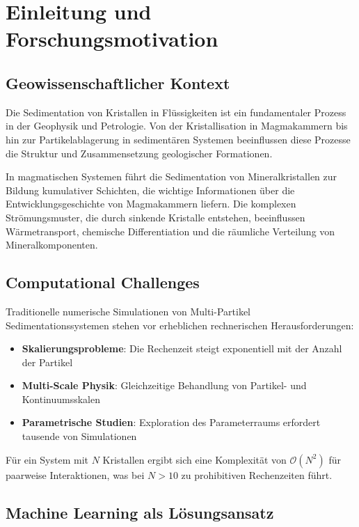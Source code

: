 \documentclass[12pt,twoside,openright]{scrreprt}
\theoremstyle{definition}
\theoremstyle{plain}
\begin{document}
	\tableofcontents
	\listoffigures
	\listoftables
	
	\chapter{Einleitung und Forschungsmotivation}
	\label{ch:introduction}
	
	\section{Geowissenschaftlicher Kontext}
	
	Die Sedimentation von Kristallen in Flüssigkeiten ist ein fundamentaler Prozess in der Geophysik und Petrologie. Von der Kristallisation in Magmakammern bis hin zur Partikelablagerung in sedimentären Systemen beeinflussen diese Prozesse die Struktur und Zusammensetzung geologischer Formationen.
	
	In magmatischen Systemen führt die Sedimentation von Mineralkristallen zur Bildung kumulativer Schichten, die wichtige Informationen über die Entwicklungsgeschichte von Magmakammern liefern. Die komplexen Strömungsmuster, die durch sinkende Kristalle entstehen, beeinflussen Wärmetransport, chemische Differentiation und die räumliche Verteilung von Mineralkomponenten.
	
	\section{Computational Challenges}
	
	Traditionelle numerische Simulationen von Multi-Partikel Sedimentationssystemen stehen vor erheblichen rechnerischen Herausforderungen:
	
	\begin{itemize}
		\item \textbf{Skalierungsprobleme}: Die Rechenzeit steigt exponentiell mit der Anzahl der Partikel
		\item \textbf{Multi-Scale Physik}: Gleichzeitige Behandlung von Partikel- und Kontinuumsskalen
		\item \textbf{Parametrische Studien}: Exploration des Parameterraums erfordert tausende von Simulationen
	\end{itemize}
	
	Für ein System mit $N$ Kristallen ergibt sich eine Komplexität von $\mathcal{O}(N^2)$ für paarweise Interaktionen, was bei $N > 10$ zu prohibitiven Rechenzeiten führt.
	
	\section{Machine Learning als Lösungsansatz}
	
\end{document}
